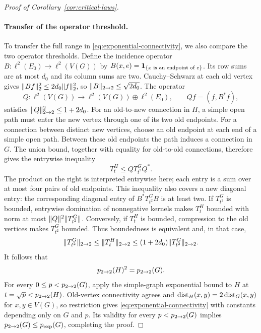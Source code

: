 \begin{proof}[Proof of Corollary~\ref{cor:critical-laws}]
\paragraph{Transfer of the operator threshold.}
To transfer the full range in \eqref{eq:exponential-connectivity},
we also compare the two operator thresholds. Define the incidence
operator $B:\ell^2(E_0)\to\ell^2(V(G))$ by
$B(x,e)=\mathbf 1_{\{x\text{ is an endpoint of }e\}}$.
Its row sums are at most $d_0$ and its column sums are two.
Cauchy--Schwarz at each old vertex gives
$\lVert Bf\rVert_2^2\le2d_0\lVert f\rVert_2^2$, so
$\lVert B\rVert_{2\to2}\le\sqrt{2d_0}$. The operator
\[
 Q:\ell^2(V(G))\longrightarrow
       \ell^2(V(G))\oplus\ell^2(E_0),\qquad
 Qf=(f,B^*f),
\]
satisfies $\lVert Q\rVert_{2\to2}^{2}\le1+2d_0$.
For an old-to-new connection in $H$, a simple open path must enter the new
vertex through one of its two old endpoints. For a connection between
distinct new vertices, choose an old endpoint at each end of a simple open
path. Between these old endpoints the path induces a connection in
$G$. The union bound, together with equality for old-to-old
connections, therefore gives the entrywise inequality
\[
 T_t^H\le Q T_{t^2}^G Q^*.
\]
The product on the right is interpreted entrywise here; each entry
is a sum over at most four pairs of old endpoints.
This inequality also covers a new diagonal entry: the corresponding
diagonal entry of $B^*T_{t^2}^G B$ is at least two.
If $T_{t^2}^G$ is bounded, entrywise domination of nonnegative
kernels makes $T_t^H$ bounded with norm at most
$\lVert Q\rVert^2\lVert T_{t^2}^G\rVert$. Conversely, if $T_t^H$ is bounded,
compression to the old vertices makes $T_{t^2}^G$ bounded.
Thus boundedness is equivalent and, in that case,
\[
 \lVert T_{t^2}^G\rVert_{2\to2}
 \le\lVert T_t^H\rVert_{2\to2}
 \le(1+2d_0)\lVert T_{t^2}^G\rVert_{2\to2}.
\]
It follows that
\[
 {p_{2\to2}}(H)^2={p_{2\to2}}(G).
\]
For every $0\le p<{p_{2\to2}}(G)$, apply the simple-graph exponential
bound to $H$ at $t=\sqrt p<{p_{2\to2}}(H)$. Old-vertex connectivity agrees
and $\operatorname{dist}_H(x,y)=2\operatorname{dist}_G(x,y)$ for $x,y\in V(G)$, so restriction
gives \eqref{eq:exponential-connectivity} with constants depending
only on $G$ and $p$. Its validity for every $p<{p_{2\to2}}(G)$ implies
${p_{2\to2}}(G)\le{p_{\exp}}(G)$, completing the proof.
\end{proof}
